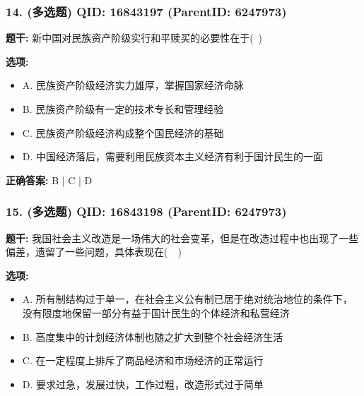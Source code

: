 \documentclass[12pt,UTF8]{ctexart}
\begin{document}
\vspace{0.3em}\hrulefill\vspace{0.7em}

\subsubsection*{14. (多选题) \small QID: 16843197 (ParentID: 6247973)}

\textbf{题干:}
新中国对民族资产阶级实行和平赎买的必要性在于( )



\textbf{选项:}
\begin{itemize}[leftmargin=*]

  \item A. 民族资产阶级经济实力雄厚，掌握国家经济命脉

  \item B. 民族资产阶级有一定的技术专长和管理经验

  \item C. 民族资产阶级经济构成整个国民经济的基础

  \item D. 中国经济落后，需要利用民族资本主义经济有利于国计民生的一面

\end{itemize}

\textbf{正确答案:}
B | C | D

\vspace{0.3em}\hrulefill\vspace{0.7em}

\subsubsection*{15. (多选题) \small QID: 16843198 (ParentID: 6247973)}

\textbf{题干:}
我国社会主义改造是一场伟大的社会变革，但是在改造过程中也出现了一些偏差，遗留了一些问题，具体表现在(  )



\textbf{选项:}
\begin{itemize}[leftmargin=*]

  \item A. 所有制结构过于单一，在社会主义公有制已居于绝对统治地位的条件下，没有限度地保留一部分有益于国计民生的个体经济和私营经济

  \item B. 高度集中的计划经济体制也随之扩大到整个社会经济生活

  \item C. 在一定程度上排斥了商品经济和市场经济的正常运行

  \item D. 要求过急，发展过快，工作过粗，改造形式过于简单

\end{itemize}
\end{document}

